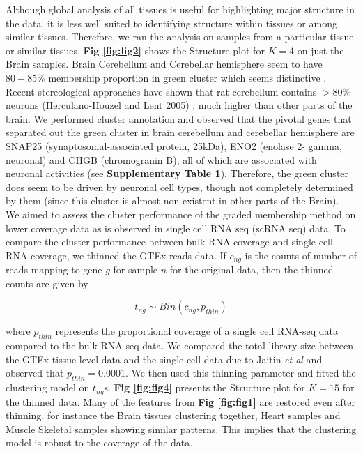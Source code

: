 Although global analysis of all tissues is useful for highlighting major structure in the data, it is less well suited to identifying structure within tissues or among similar tissues. Therefore, we ran the analysis on samples from a particular tissue or similar tissues. \textbf{Fig \ref{fig:fig2}} shows the Structure plot for $K=4$ on just the Brain samples. Brain Cerebellum and Cerebellar hemisphere seem to have   $80-85 \%$ membership  proportion in green cluster which seems distinctive . Recent stereological approaches have shown that rat cerebellum contains $> 80 \%$ neurons (Herculano-Houzel and Lent 2005) \cite{Houzel2005}, much higher than other parts of the brain. We performed cluster annotation and observed that the pivotal genes that separated out the green cluster in brain cerebellum and cerebellar hemisphere are SNAP25 (synaptosomal-associated protein, 25kDa), ENO2 (enolase 2- gamma, neuronal) and CHGB (chromogranin B),  all of which are associated with neuronal activities (see \textbf{Supplementary Table 1}). Therefore, the green cluster does seem to be driven by neuronal cell types, though not completely determined by them (since this cluster is almost non-existent in other parts of the Brain).\\[3 pt]

We aimed to assess the cluster performance of the graded membership method on lower coverage data as is observed in single cell RNA seq (scRNA seq) data. To compare the cluster performance between bulk-RNA coverage and single cell-RNA coverage, we thinned the GTEx reads data. If $c_{ng}$ is the counts of number of reads mapping to gene $g$ for sample $n$ for the original data, then the thinned counts are given by 

$$ t_{ng} \sim Bin (c_{ng}, p_{thin})$$

where $p_{thin}$ represents the proportional coverage of a single cell RNA-seq data compared to the bulk RNA-seq data. We compared the total library size between the GTEx tissue level data and the single cell data due to Jaitin \textit{et al} \cite{Jaitin2014} and observed that $p_{thin} =0.0001$. We then used this thinning parameter and fitted the clustering model on $t_{ng}$s. \textbf{Fig \ref{fig:fig4}} presents the Structure plot for $K=15$ for the thinned data. Many of the features from \textbf{Fig \ref{fig:fig1}} are restored even after thinning, for instance the Brain tissues clustering together, Heart samples and Muscle Skeletal samples showing similar patterns. This implies that the clustering model is robust to the coverage of the data. \\[1 pt]

